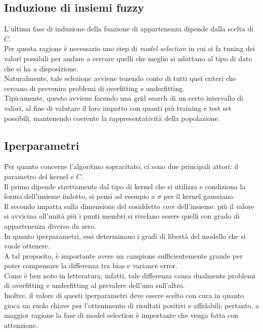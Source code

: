 \documentclass[12pt]{report}
\theoremstyle{definition}
\begin{document}
\subsection{Induzione di insiemi fuzzy}
L'ultima fase di induzione della funzione di appartenenza dipende dalla scelta di $C$.
\\
Per questa ragione è necessario uno step di \textit{model selection} in cui si fa tuning dei valori possibili per andare a cercare quelli che meglio si adattano al tipo di dato che si ha a disposizione.
\\
Naturalmente, tale selezione avviene tenendo conto di tutti quei criteri che cercano di prevenire problemi di overfitting e underfitting.
\\
Tipicamente, questo avviene facendo una grid search di un certo intervallo di valori, al fine di valutare il loro impatto con quanti più training e test set possibili, mantenendo coerente la rappresentatività della popolazione.

\subsection{Iperparametri}
Per quanto concerne l'algoritmo sopracitato, ci sono due principali attori: il parametro del kernel e $C$.
\\
Il primo dipende strettamente dal tipo di kernel che si utilizza e condiziona la forma dell'insieme indotto, si pensi ad esempio a $\sigma$ per il kernel gaussiano.
\\
Il secondo impatta sulla dimensione del cosiddetto \textit{core} dell'insieme: più il valore si avvicina all'unità più i punti membri si rivelano essere quelli con grado di appartenenza diverso da zero.
\\
In quanto iperparametri, essi determinano i gradi di libertà del modello che si vuole ottenere.
\\
A tal proposito, è importante avere un campione sufficientemente grande per poter compensare la differenza tra bias e variance error.
\\
Come è ben noto in letteratura, infatti, tale differenza causa dualmente problemi di overfitting e underfitting al prevalere dell'uno sull'altro.
\\
Inoltre, il valore di questi iperparametri deve essere scelto con cura in quanto gioca un ruolo chiave per l'ottenimento di risultati positivi e affidabili; pertanto, a maggior ragione la fase di model selection è importante che venga fatta con attenzione.
\end{document}
